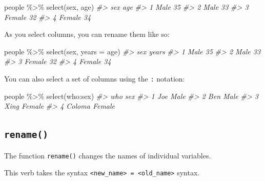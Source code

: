 \documentclass[
]{book}
\newenvironment{Shaded}{\begin{snugshade}}{\end{snugshade}}
\newcommand{\AttributeTok}[1]{\textcolor[rgb]{0.77,0.63,0.00}{#1}}
\newcommand{\CommentTok}[1]{\textcolor[rgb]{0.56,0.35,0.01}{\textit{#1}}}
\newcommand{\FunctionTok}[1]{\textcolor[rgb]{0.00,0.00,0.00}{#1}}
\newcommand{\NormalTok}[1]{#1}
\newcommand{\SpecialCharTok}[1]{\textcolor[rgb]{0.00,0.00,0.00}{#1}}
\begin{document}
\begin{Shaded}
\begin{Highlighting}[]
\NormalTok{people }\SpecialCharTok{\%\textgreater{}\%} \FunctionTok{select}\NormalTok{(sex, age)}
\CommentTok{\#\textgreater{}      sex age}
\CommentTok{\#\textgreater{} 1   Male  35}
\CommentTok{\#\textgreater{} 2   Male  33}
\CommentTok{\#\textgreater{} 3 Female  32}
\CommentTok{\#\textgreater{} 4 Female  34}
\end{Highlighting}
\end{Shaded}

As you select columns, you can rename them like so:

\begin{Shaded}
\begin{Highlighting}[]
\NormalTok{people }\SpecialCharTok{\%\textgreater{}\%} \FunctionTok{select}\NormalTok{(sex, }\AttributeTok{years =}\NormalTok{ age)}
\CommentTok{\#\textgreater{}      sex years}
\CommentTok{\#\textgreater{} 1   Male    35}
\CommentTok{\#\textgreater{} 2   Male    33}
\CommentTok{\#\textgreater{} 3 Female    32}
\CommentTok{\#\textgreater{} 4 Female    34}
\end{Highlighting}
\end{Shaded}

You can also select a set of columns using the \texttt{:} notation:

\begin{Shaded}
\begin{Highlighting}[]
\NormalTok{people }\SpecialCharTok{\%\textgreater{}\%} \FunctionTok{select}\NormalTok{(who}\SpecialCharTok{:}\NormalTok{sex)}
\CommentTok{\#\textgreater{}      who    sex}
\CommentTok{\#\textgreater{} 1    Joe   Male}
\CommentTok{\#\textgreater{} 2    Ben   Male}
\CommentTok{\#\textgreater{} 3   Xing Female}
\CommentTok{\#\textgreater{} 4 Coloma Female}
\end{Highlighting}
\end{Shaded}

\hypertarget{rename}{%
\subsection*{\texorpdfstring{\texttt{rename()}}{rename()}}\label{rename}}

The function \texttt{rename()} changes the names of individual variables.

This verb takes the syntax \texttt{\textless{}new\_name\textgreater{}\ =\ \textless{}old\_name\textgreater{}} syntax.
\end{document}
